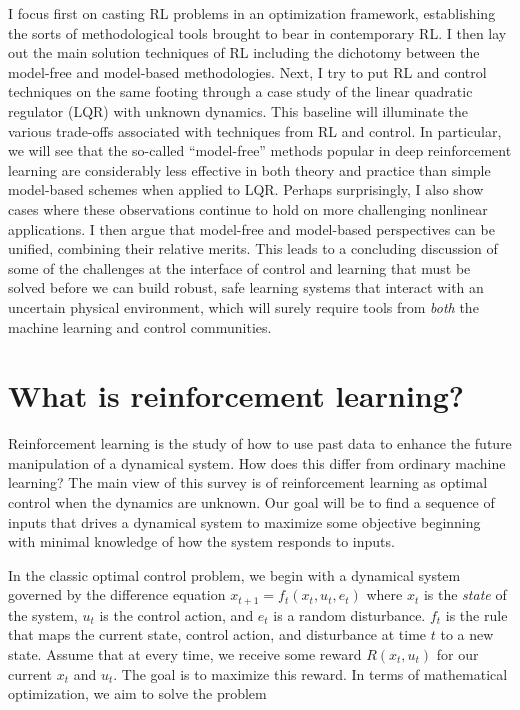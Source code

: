 \documentclass[11pt]{article}
\numberwithin{equation}{section}
\begin{document}
I focus first on casting RL problems in an optimization framework, establishing the sorts of methodological tools brought to bear in contemporary RL. I then lay out the main solution techniques of RL including the dichotomy between the model-free and model-based methodologies. Next, I try to put RL and control techniques on the same footing through a case study of the linear quadratic regulator (LQR) with unknown dynamics. This baseline will illuminate the various trade-offs associated with techniques from RL and control. In particular, we will see that the so-called ``model-free'' methods popular in deep reinforcement learning are considerably less effective in both theory and practice than simple model-based schemes when applied to LQR. Perhaps surprisingly, I also show cases where these observations continue to hold on more challenging nonlinear applications. I then argue that model-free and model-based perspectives can be unified, combining their relative merits. This leads to a concluding discussion of some of the challenges at the interface of control and learning that must be solved before we can build robust, safe learning systems that interact with an uncertain physical environment, which will surely require tools from \emph{both} the machine learning and control communities.

\section{What is reinforcement learning?}

Reinforcement learning is the study of how to use past data to enhance the future manipulation of a dynamical system. How does this differ from ordinary machine learning? The main view of this survey is of reinforcement learning as optimal control when the dynamics are unknown. Our goal will be to find a sequence of inputs that drives a dynamical system to maximize some objective beginning with minimal knowledge of how the system responds to inputs.

In the classic optimal control problem, we begin with a dynamical system governed by the difference equation $x_{t+1} = f_t(x_t,u_t,e_t)$ where $x_t$ is the \emph{state} of the system, ${u_t}$ is the control action, and ${e_t}$ is a random disturbance. $f_t$ is the rule that maps the current state, control action, and disturbance at time $t$ to a new state. Assume that at every time, we receive some reward $R(x_t,u_t)$ for our current $x_t$ and $u_t$. The goal is to maximize this reward. In terms of mathematical optimization, we aim to solve the problem
\end{document}
